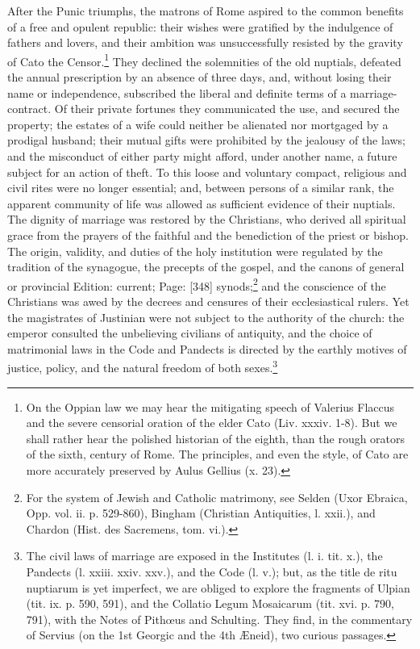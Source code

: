 After the Punic triumphs, the matrons of Rome aspired to the common benefits of a free and opulent republic: their wishes were gratified by the indulgence of fathers and lovers, and their ambition was unsuccessfully resisted by the gravity of Cato the Censor.\footnote{On the Oppian law we may hear the mitigating speech of Valerius Flaccus and the severe censorial oration of the elder Cato (Liv. xxxiv. 1-8). But we shall rather hear the polished historian of the eighth, than the rough orators of the sixth, century of Rome. The principles, and even the style, of Cato are more accurately preserved by Aulus Gellius (x. 23).} They declined the solemnities of the old nuptials, defeated the annual prescription by an absence of three days, and, without losing their name or independence, subscribed the liberal and definite terms of a marriage-contract. Of their private fortunes they communicated the use, and secured the property; the estates of a wife could neither be alienated nor mortgaged by a prodigal husband; their mutual gifts were prohibited by the jealousy of the laws; and the misconduct of either party might afford, under another name, a future subject for an action of theft. To this loose and voluntary compact, religious and civil rites were no longer essential; and, between persons of a similar rank, the apparent community of life was allowed as sufficient evidence of their nuptials. The dignity of marriage was restored by the Christians, who derived all spiritual grace from the prayers of the faithful and the benediction of the priest or bishop. The origin, validity, and duties of the holy institution were regulated by the tradition of the synagogue, the precepts of the gospel, and the canons of general or provincial Edition: current; Page: [348] synods;\footnote{For the system of Jewish and Catholic matrimony, see Selden (Uxor Ebraica, Opp. vol. ii. p. 529-860), Bingham (Christian Antiquities, l. xxii.), and Chardon (Hist. des Sacremens, tom. vi.).} and the conscience of the Christians was awed by the decrees and censures of their ecclesiastical rulers. Yet the magistrates of Justinian were not subject to the authority of the church: the emperor consulted the unbelieving civilians of antiquity, and the choice of matrimonial laws in the Code and Pandects is directed by the earthly motives of justice, policy, and the natural freedom of both sexes.\footnote{The civil laws of marriage are exposed in the Institutes (l. i. tit. x.), the Pandects (l. xxiii. xxiv. xxv.), and the Code (l. v.); but, as the title de ritu nuptiarum is yet imperfect, we are obliged to explore the fragments of Ulpian (tit. ix. p. 590, 591), and the Collatio Legum Mosaicarum (tit. xvi. p. 790, 791), with the Notes of Pithœus and Schulting. They find, in the commentary of Servius (on the 1st Georgic and the 4th Æneid), two curious passages.}


